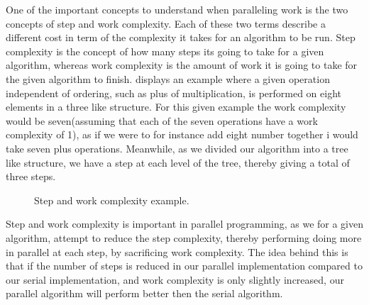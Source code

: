 One of the important concepts to understand when paralleling work is the two concepts of step and work complexity. Each of these two terms describe a different cost in term of the complexity it takes for an algorithm to be run. Step complexity is the concept of how many steps its going to take for a given algorithm, whereas work complexity is the amount of work it is going to take for the given algorithm to finish.  displays an example where a given operation independent of ordering, such as plus of multiplication, is performed on eight elements in a three like structure. For this given example the work complexity would be seven(assuming that each of the seven operations have a work complexity of 1), as if we were to for instance add eight number together i would take seven plus operations. Meanwhile, as we divided our algorithm into a tree like structure, we have a step at each level of the tree, thereby giving a total of three steps.

\begin{figure}[ht]
	\centering
	\caption{Step and work complexity example.}
	\label{fig:stepnwork}
\end{figure}

Step and work complexity is important in parallel programming, as we for a given algorithm, attempt to reduce the step complexity, thereby performing doing more in parallel at each step, by sacrificing work complexity. The idea behind this is that if the number of steps is reduced in our parallel implementation compared to our serial implementation, and work complexity is only slightly increased, our parallel algorithm will perform better then the serial algorithm.
